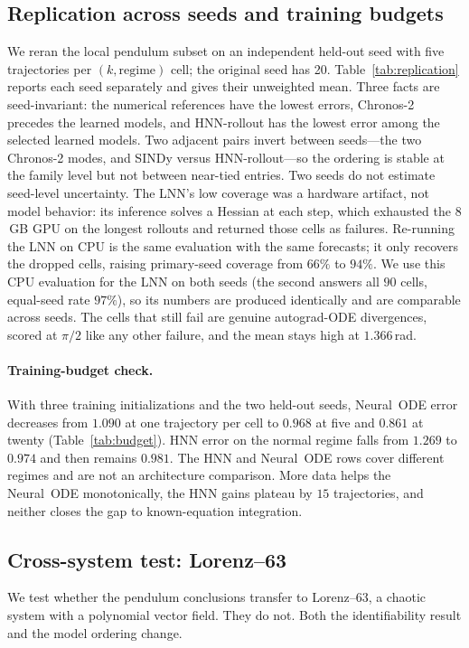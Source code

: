 \documentclass{article}
\begin{document}
\subsection{Replication across seeds and training budgets}
\label{sec:replication}
We reran the local pendulum subset on an independent held-out seed with five trajectories per
$(k,\text{regime})$ cell; the original seed has 20. Table~\ref{tab:replication} reports each
seed separately and gives their unweighted mean. Three facts are seed-invariant: the numerical
references have the lowest errors, Chronos-2 precedes the learned models, and HNN-rollout has
the lowest error among the selected learned models. Two adjacent pairs invert between seeds---the
two Chronos-2 modes, and SINDy versus HNN-rollout---so the ordering is stable at the family
level but not between near-tied entries. Two seeds do not estimate seed-level uncertainty. The
LNN's low coverage was a hardware artifact, not model behavior: its
inference solves a Hessian at each step, which exhausted the $8$\,GB GPU on the longest
rollouts and returned those cells as failures. Re-running the LNN on CPU is the same evaluation
with the same forecasts; it only recovers the dropped cells, raising primary-seed coverage from
$66\%$ to $94\%$. We use this CPU evaluation for the LNN on both seeds (the second answers all
$90$ cells, equal-seed rate $97\%$), so its numbers are produced identically and are comparable
across seeds. The cells that still fail are genuine autograd-ODE divergences, scored at $\pi/2$
like any other failure, and the mean stays high at $1.366$\,rad.

\paragraph{Training-budget check.}
With three training initializations and the two held-out seeds, Neural~ODE error decreases
from $1.090$ at one trajectory per cell to $0.968$ at five and $0.861$ at twenty
(Table~\ref{tab:budget}). HNN error on the normal regime falls from $1.269$ to $0.974$ and
then remains $0.981$. The HNN and Neural~ODE rows cover different regimes and are not an
architecture comparison. More data helps the Neural~ODE monotonically, the HNN gains plateau
by $15$ trajectories, and neither closes the gap to known-equation integration.

\subsection{Cross-system test: Lorenz--63}
\label{sec:lorenz}
We test whether the pendulum conclusions transfer to Lorenz--63, a chaotic system with a
polynomial vector field. They do not. Both the identifiability result and the model ordering
change.
\end{document}
